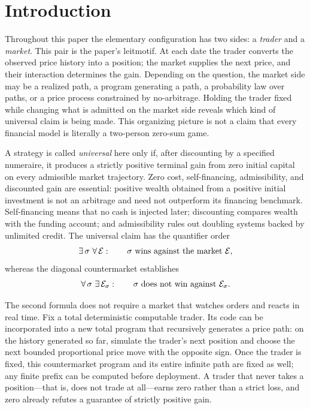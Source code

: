 \documentclass[aps,pra,reprint,superscriptaddress,amsmath,amssymb,floatfix]{revtex4-2}
\theoremstyle{plain}
\theoremstyle{definition}
\theoremstyle{remark}
\begin{document}
\section{Introduction}
\label{sec:intro}

Throughout this paper the elementary configuration has two sides: a
\emph{trader} and a \emph{market}. This pair is the paper's leitmotif. At each
date the trader converts the observed price history into a position; the
market supplies the next price, and their interaction determines the gain.
Depending on the question, the market side may be a realized path, a program
generating a path, a probability law over paths, or a price process constrained
by no-arbitrage. Holding the trader fixed while changing what is admitted on
the market side reveals which kind of universal claim is being made. This
organizing picture is not a claim that every financial model is literally a
two-person zero-sum game.

A strategy is called \emph{universal} here only if, after discounting by a
specified numeraire, it produces a strictly positive terminal gain from zero
initial capital on every admissible market trajectory. Zero cost,
self-financing, admissibility, and discounted gain are essential: positive
wealth obtained from a positive initial investment is not an arbitrage and
need not outperform its financing benchmark. Self-financing means that no cash
is injected later; discounting compares wealth with the funding account; and
admissibility rules out doubling systems backed by unlimited credit. The
universal claim has the quantifier order
\begin{equation}
  \exists\,\sigma\ \forall\,\mathcal E:
  \qquad \sigma\ \hbox{wins against the market }\mathcal E ,
  \label{eq:universalquantifiers}
\end{equation}
whereas the diagonal countermarket establishes
\begin{equation}
  \forall\,\sigma\ \exists\,\mathcal E_\sigma:
  \qquad \sigma\ \hbox{does not win against }\mathcal E_\sigma .
  \label{eq:counterquantifiers}
\end{equation}

The second formula does not require a market that watches orders and reacts in
real time. Fix a total deterministic computable trader. Its code can be
incorporated into a new total program that recursively generates a price path:
on the history generated so far, simulate the trader's next position and choose
the next bounded proportional price move with the opposite sign. Once the
trader is fixed, this countermarket program and its entire infinite path are
fixed as well; any finite prefix can be computed before deployment. A trader
that never takes a position---that is, does not trade at all---earns zero
rather than a strict loss, and zero already refutes a guarantee of strictly
positive gain.
\end{document}
